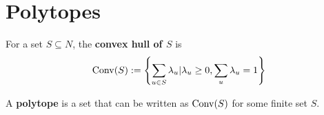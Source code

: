 \section{Polytopes}


\begin{definition}
  \label{3-convex-hull}
  \uses{}
  \leanok
  For a set $S \subseteq N$, the {\bf convex hull of $S$} is
  $$\operatorname{Conv}(S) := \left\{\sum_{u \in S} \lambda_u | \lambda_u \ge 0, \sum_u \lambda_u = 1\right\}$$
\end{definition}


\begin{definition}[Polytope]
    \label{1-2-2-polytope}
  
    A {\bf polytope} is a set that can be written as $\operatorname{Conv}(S)$ for some finite set $S$.
  \end{definition}